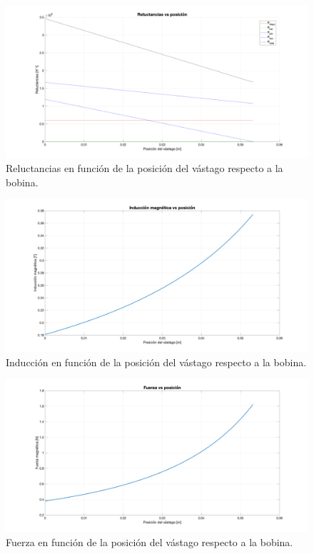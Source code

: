 \begin{figure}[H]
    \centering
    \includegraphics[width=13cm]{FigurasMemoria/calcRsetupBase.png}
    \caption{Reluctancias en función de la posición del vástago respecto a la bobina.}
    \label{fig:calcRsetupBase} %
\end{figure}

\begin{figure}[H]
    \centering
    \includegraphics[width=\linewidth]{FigurasMemoria/calcBsetupBase.png}
    \caption{Inducción en función de la posición del vástago respecto a la bobina.}
    \label{fig:calcBsetupBase} %
\end{figure}

\begin{figure}[H]
    \centering
    \includegraphics[width=\linewidth]{FigurasMemoria/calcFsetupBase.png}
    \caption{Fuerza en función de la posición del vástago respecto a la bobina.}
    \label{fig:calcFsetupBase} %
\end{figure}

